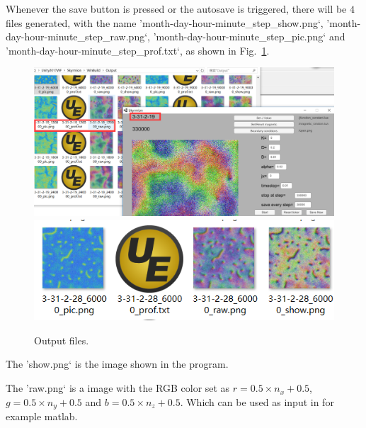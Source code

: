 \documentclass[aps,superscriptaddress,groupedaddress]{revtex4}  %
\begin{document}
Whenever the save button is pressed or the autosave is triggered, there will be $4$ files generated, with the name 'month-day-hour-minute\_step\_show.png`, 'month-day-hour-minute\_step\_raw.png`, 'month-day-hour-minute\_step\_pic.png` and 'month-day-hour-minute\_step\_prof.txt`, as shown in Fig.~\ref{Fig:output}.
\begin{figure}
\includegraphics[scale=0.5]{intro4.png}
\includegraphics[scale=0.5]{output1.png}
\caption{\label{Fig:output}Output files.}
\end{figure}

The 'show.png` is the image shown in the program.

The 'raw.png` is a image with the RGB color set as $r=0.5\times n_x+0.5$, $g=0.5\times n_y+0.5$ and $b=0.5\times n_z+0.5$. Which can be used as input in for example matlab.
\end{document}
